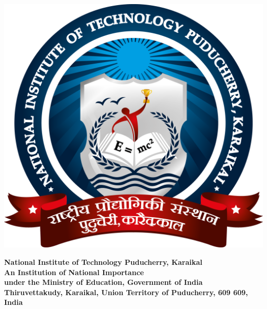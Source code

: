 \documentclass[12pt]{article}
\begin{document}
	
	\linespread{1}\selectfont
	\pagestyle{empty}
	
	{
		
		\vspace*{-0.45cm}
		
		\begin{minipage}[r]{1.5in}
			\centering
			\vspace{0.5cm}
			\begin{center}
				\includegraphics[scale=0.15]{NITPY-logo.png}	
			\end{center}
		\end{minipage}
		\begin{minipage}[r]{8in}
			\centering
			\begin{center}
				\Large{
					\textbf{\LARGE \color{blue} National Institute of Technology Puducherry, Karaikal}\\
					\vspace{-0.20cm}
					\textbf{\large \color{blue} An Institution of National Importance}\\
					\vspace{-0.20cm}
					\textbf{\large \color{blue} under the Ministry of Education, Government of India}\\
					\vspace{-0.20cm}
					\textbf{\large \color{blue} Thiruvettakudy, Karaikal, Union Territory of Puducherry, 609 609, India}\\
				}
			\end{center}
		\end{minipage}
		
}
\end{document}
